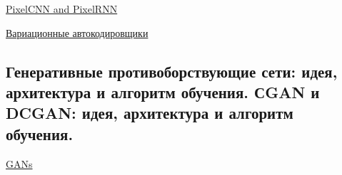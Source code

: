 \documentclass{article}
\begin{document}
\href{
	https://neerc.ifmo.ru/wiki/index.php?title=PixelRNN_%
}{PixelCNN and PixelRNN}

\href{
	http://neerc.ifmo.ru/wiki/index.php?title=%
}{Вариационные автокодировщики}


\subsection{Генеративные противоборствующие сети: идея, архитектура и алгоритм
обучения. СGAN и DCGAN: идея, архитектура и алгоритм обучения.}

\href{
	https://neerc.ifmo.ru/wiki/index.php?title=Generative_Adversarial_Nets_(GAN)
}{GANs}
\end{document}
